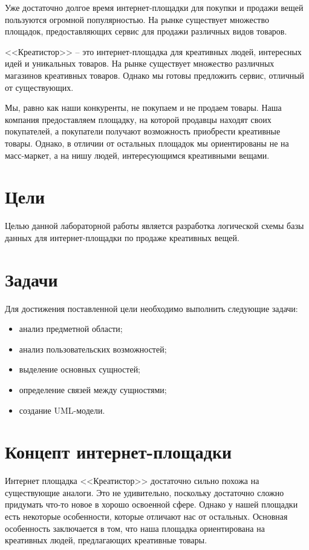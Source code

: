 \documentclass[a4paper,14pt]{extarticle}
\begin{document}
Уже достаточно долгое время интернет-площадки для покупки и продажи вещей пользуются огромной популярностью. На рынке существует множество площадок, предоставляющих сервис для продажи различных видов товаров.

<<Креатистор>> -- это интернет-площадка для креативных людей, интересных идей и уникальных товаров. На рынке существует множество различных магазинов креативных товаров. Однако мы готовы предложить сервис, отличный от существующих.

Мы, равно как наши конкуренты, не покупаем и не продаем товары. Наша компания предоставляем площадку, на которой продавцы находят своих покупателей, а покупатели получают возможность приобрести креативные товары. Однако, в отличии от остальных площадок мы ориентированы не на масс-маркет, а на нишу людей, интересующимся креативными вещами.

\section{Цели}

Целью данной лабораторной работы является разработка логической схемы базы данных для интернет-площадки по продаже креативных вещей.

\section{Задачи}

Для достижения поставленной цели необходимо выполнить следующие задачи:
\begin{itemize}
    \item анализ предметной области;
    \item анализ пользовательских возможностей;
    \item выделение основных сущностей;
    \item определение связей между сущностями;
    \item создание UML-модели.
\end{itemize}

\section{Концепт интернет-площадки}

Интернет площадка <<Креатистор>> достаточно сильно похожа на существующие аналоги. Это не удивительно, поскольку достаточно сложно придумать что-то новое в хорошо освоенной сфере. Однако у нашей площадки есть некоторые особенности, которые отличают нас от остальных. Основная особенность заключается в том, что наша площадка ориентирована на креативных людей, предлагающих креативные товары.
\end{document}
